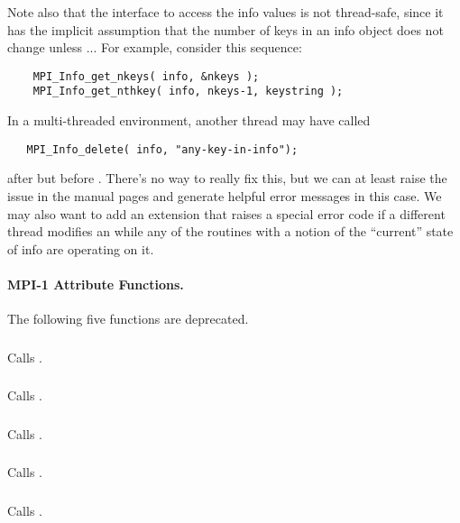 \documentclass{article}
\begin{document}
Note also that the interface to access the info values is not
thread-safe, since it has the implicit assumption that the number of
keys in an info object does not change unless ...
For example, consider this sequence:
\begin{verbatim}
    MPI_Info_get_nkeys( info, &nkeys );
    MPI_Info_get_nthkey( info, nkeys-1, keystring );
\end{verbatim}
In a multi-threaded environment, another thread may have called
\begin{verbatim}
   MPI_Info_delete( info, "any-key-in-info");
\end{verbatim}
after  but before
.  There's no way to really fix this, but
we can at least raise the issue in the manual pages and generate
helpful error messages in this case.  We may also want to add an
extension that raises a special error code if a different thread
modifies an  while any of the routines with a notion of
the ``current'' state of info are operating on it.

\paragraph{MPI-1 Attribute Functions.}
The following five functions are deprecated.
\subsubsection{}
Calls .

\subsubsection{}
Calls .

\subsubsection{}
Calls .

\subsubsection{}
Calls .

\subsubsection{}
Calls .
\end{document}
